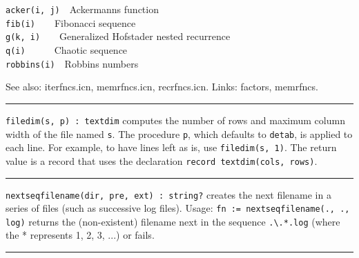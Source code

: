 \texttt{acker(i, j)}\ \ Ackermann{\textquotesingle}s function\\
\texttt{fib(i)}\ \ \ \ Fibonacci sequence\\
\texttt{g(k, i)}\ \ \ \ Generalized Hofstader nested recurrence\\
\texttt{q(i)}\ \ \ \ \ \ {\textquotedbl}Chaotic{\textquotedbl}
sequence\\
\texttt{robbins(i)}\ \ Robbins numbers

See also: iterfncs.icn, memrfncs.icn, recrfncs.icn. Links: factors,
memrfncs. 

\vspace{0.25cm}\hrule{}

\texttt{filedim(s, p) : textdim} computes the number of rows and maximum
column width of the file named \texttt{s}. The procedure \texttt{p},
which defaults to \texttt{detab}, is applied to each line. For example,
to have lines left as is, use \texttt{filedim(s, 1)}. The return value
is a record that uses the declaration \texttt{record textdim(cols,
rows)}. 

\vspace{0.25cm}\hrule{}

\texttt{nextseqfilename(dir, pre, ext) : string?} creates the next
filename in a series of files (such as successive
log files). Usage: \texttt{fn :=
nextseqfilename({\textquotedbl}.{\textquotedbl},
{\textquotedbl}.{\textquotedbl}, {\textquotedbl}log{\textquotedbl})}
returns the (non-existent) filename next in the sequence
\texttt{.{\textbackslash}.*.log} (where the * represents 1, 2, 3, ...)
or fails.

\vspace{0.25cm}\hrule{}

